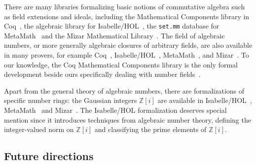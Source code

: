 \documentclass[a4paper,USenglish,cleveref, autoref, thm-restate]{lipics-v2021}
\newcommand{\Z}{\mathbb{Z}}
\begin{document}
There are many libraries formalizing basic notions of commutative algebra such as field extensions and ideals, including the Mathematical Components library in Coq~\cite{mathcomp}, the algebraic library for Isabelle/HOL~\cite{algebra_isabelle}, the \texttt{set.mm} database for MetaMath~\cite{metamath} and the Mizar Mathematical Library~\cite{algebraic-hierarchy_mizar}. The field of algebraic numbers, or more generally algebraic closures of arbitrary fields, are also available in many provers, for example Coq~\cite{real-algebraic-numbers-coq, mathcomp}, Isabelle/HOL~\cite{algebraic-numbers-isabelle}, MetaMath~\cite{algebraic-numbers-metamath}, and Mizar~\cite{algebraic-numbers-mizar}. To our knowledge, the Coq Mathematical Components library is the only formal development beside ours specifically dealing with number fields~\cite[\texttt{field/algnum.v}]{mathcomp}.

Apart from the general theory of algebraic numbers, there are formalizations of specific number rings: the Gaussian integers $\Z[i]$ are available in Isabelle/HOL~\cite{gaussian_integers-isabelle}, MetaMath~\cite{gaussian_integers-metamath} and Mizar~\cite{gaussian_integers-mizar}.
The Isabelle/HOL formalization deserves special mention since it introduces techniques from algebraic number theory,
defining the integer-valued norm on $\Z[i]$ and classifying the prime elements of $\Z[i]$.

\subsection{Future directions}
\end{document}
